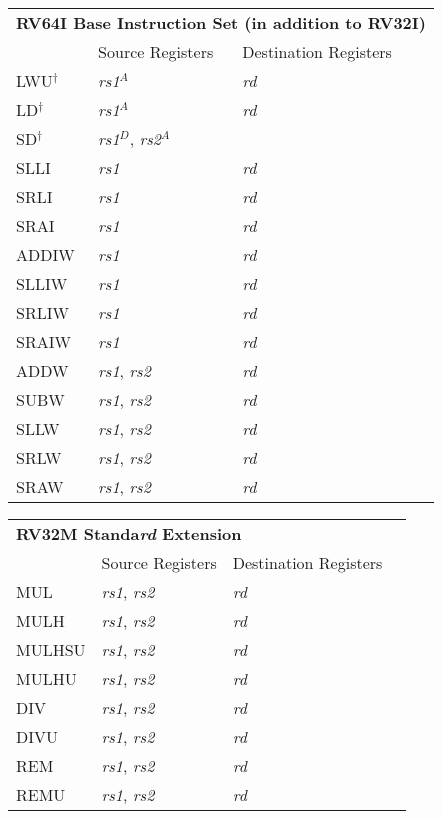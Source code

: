 \begin{tabular}{p{25mm}|p{3cm}|p{6cm}|p{10cm}}
  \multicolumn{4}{l}{\bf RV64I Base Instruction Set (in addition to RV32I)} \\
  \cline{2-3}
   & Source Registers & Destination Registers \\
  \cline{2-3}
   LWU$^\dagger$ & {\em rs1}$^A$ & {\em rd} &  \\
   \cline{2-3}
   LD$^\dagger$ & {\em rs1}$^A$ & {\em rd} &  \\
   \cline{2-3}
   SD$^\dagger$ & {\em rs1}$^D$, {\em rs2}$^A$ &  &  \\
   \cline{2-3}
   SLLI & {\em rs1} & {\em rd} &  \\
   \cline{2-3}
   SRLI & {\em rs1} & {\em rd} &  \\
   \cline{2-3}
   SRAI & {\em rs1} & {\em rd} &  \\
   \cline{2-3}
   ADDIW & {\em rs1} & {\em rd} &  \\
   \cline{2-3}
   SLLIW & {\em rs1} & {\em rd} &  \\
   \cline{2-3}
   SRLIW & {\em rs1} & {\em rd} &  \\
   \cline{2-3}
   SRAIW & {\em rs1} & {\em rd} &  \\
   \cline{2-3}
   ADDW & {\em rs1}, {\em rs2} & {\em rd} &  \\
   \cline{2-3}
   SUBW & {\em rs1}, {\em rs2} & {\em rd} &  \\
   \cline{2-3}
   SLLW & {\em rs1}, {\em rs2} & {\em rd} &  \\
   \cline{2-3}
   SRLW & {\em rs1}, {\em rs2} & {\em rd} &  \\
   \cline{2-3}
   SRAW & {\em rs1}, {\em rs2} & {\em rd} &  \\
   \cline{2-3}
\end{tabular}

\begin{tabular}{p{25mm}|p{3cm}|p{6cm}|p{10cm}}
  \multicolumn{4}{l}{\bf RV32M Standa{\em rd} Extension} \\
  \cline{2-3}
   & Source Registers & Destination Registers \\
  \cline{2-3}
   MUL & {\em rs1}, {\em rs2} & {\em rd} &  \\
   \cline{2-3}
   MULH & {\em rs1}, {\em rs2} & {\em rd} &  \\
   \cline{2-3}
   MULHSU & {\em rs1}, {\em rs2} & {\em rd} &  \\
   \cline{2-3}
   MULHU & {\em rs1}, {\em rs2} & {\em rd} &  \\
   \cline{2-3}
   DIV & {\em rs1}, {\em rs2} & {\em rd} &  \\
   \cline{2-3}
   DIVU & {\em rs1}, {\em rs2} & {\em rd} &  \\
   \cline{2-3}
   REM & {\em rs1}, {\em rs2} & {\em rd} &  \\
   \cline{2-3}
   REMU & {\em rs1}, {\em rs2} & {\em rd} &  \\
   \cline{2-3}
\end{tabular}

